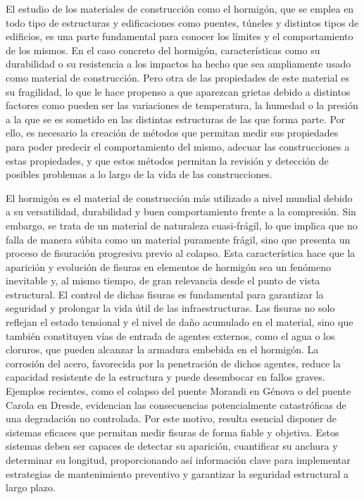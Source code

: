 
El estudio de los materiales de construcción como el hormigón, que se emplea en todo tipo de estructuras y edificaciones como puentes, túneles y distintos tipos de edificios, es una parte fundamental para conocer los límites y el comportamiento de los mismos. En el caso concreto del hormigón, características como su  durabilidad o su resistencia a los impactos ha hecho que sea ampliamente usado como material de construcción. Pero otra de las propiedades de este material es su fragilidad, lo que le hace propenso a que aparezcan grietas debido a distintos factores como pueden ser las variaciones de temperatura, la humedad o la presión a la que se es sometido en las distintas estructuras de las que forma parte. \cite{Zhang2024Review} Por ello, es necesario la creación de métodos que permitan medir sus propiedades para poder predecir el comportamiento del mismo, adecuar las construcciones a estas propiedades, y que estos métodos permitan la revisión y detección de posibles problemas a lo largo de la vida de las construcciones.

El hormigón es el material de construcción más utilizado a nivel mundial debido a su versatilidad, durabilidad y buen comportamiento frente a la compresión. Sin embargo, se trata de un material de naturaleza cuasi-frágil, lo que implica que no falla de manera súbita como un material puramente frágil, sino que presenta un proceso de fisuración progresiva previo al colapso. Esta característica hace que la aparición y evolución de fisuras en elementos de hormigón sea un fenómeno inevitable y, al mismo tiempo, de gran relevancia desde el punto de vista estructural. El control de dichas fisuras es fundamental para garantizar la seguridad y prolongar la vida útil de las infraestructuras. Las fisuras no solo reflejan el estado tensional y el nivel de daño acumulado en el material, sino que también constituyen vías de entrada de agentes externos, como el agua o los cloruros, que pueden alcanzar la armadura embebida en el hormigón. La corrosión del acero, favorecida por la penetración de dichos agentes, reduce la capacidad resistente de la estructura y puede desembocar en fallos graves. Ejemplos recientes, como el colapso del puente Morandi en Génova o del puente Carola en Dresde, evidencian las consecuencias potencialmente catastróficas de una degradación no controlada. Por este motivo, resulta esencial disponer de sistemas eficaces que permitan medir fisuras de forma fiable y objetiva. Estos sistemas deben ser capaces de detectar su aparición, cuantificar su anchura y determinar su longitud, proporcionando así información clave para implementar estrategias de mantenimiento preventivo y garantizar la seguridad estructural a largo plazo.

